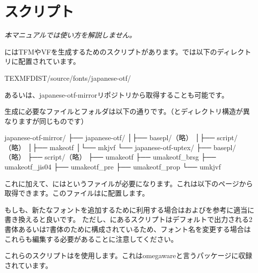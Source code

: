 \documentclass[../otf-unofficial-guide]{subfiles}
\begin{document}
\section{スクリプト}

{\noindent}\emph{本マニュアルでは使い方を解説しません。}

にはTFMやVFを生成するためのスクリプトがあります。{\TeXLive}では以下のディレクトリに配置されています。

\begin{directory}
  {\textdollar}TEXMFDIST/source/fonts/japanese-otf/
\end{directory}

あるいは、\textsf{japanese-otf-mirror}リポジトリから取得することも可能です。

生成に必要なファイルとフォルダは以下の通りです。（{\TeXLive}とディレクトリ構造が異なりますが同じものです）

\begin{directory}
japanese-otf-mirror/
  ├── japanese-otf/
  │├── basepl/（略）
  │├── script/（略）
  │├── makeotf
  │└── mkjvf
  └── japanese-otf-uptex/
                ├── basepl/（略）
                ├── script/（略）
                ├── umakeotf
                ├── umakeotf{\_}brsg
                ├── umakeotf{\_}jis04
                ├── umakeotf{\_}pre
                ├── umakeotf{\_}prop
                └── umkjvf
\end{directory}

これに加えて、にはというファイルが必要になります。これは以下のページから取得できます。このファイルはに配置します。

もしも、新たなフォントを追加するために利用する場合はおよびを参考に適当に書き換えると良いです。
ただし、にあるスクリプトはデフォルトで出力される2書体あるいは7書体のために構成されているため、フォント名を変更する場合はこれらも編集する必要があることに注意してください。

これらのスクリプトはを使用します。これはomegawareと言うパッケージに収録されています。
\end{document}
